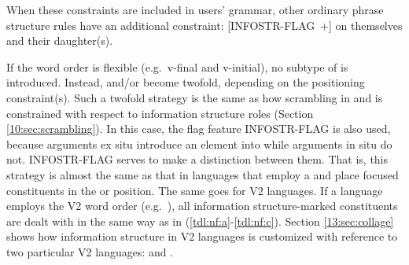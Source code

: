 




\noindent When these constraints are included in users' grammar, other
ordinary phrase structure rules have an additional constraint:
\mbox{[INFOSTR-FLAG +]} on themselves and their daughter(s).



If the word order is flexible (e.g.\ v-final and v-initial), no
subtype of  is introduced. Instead,
 and/or  become twofold,
depending on the positioning constraint(s).  Such a twofold strategy
is the same as how scrambling in  and  is
constrained with respect to information structure roles
(Section \ref{10:sec:scrambling}). In this case, the
flag feature INFOSTR-FLAG is also used, because arguments ex
situ introduce an  element into  while
arguments in situ do not. INFOSTR-FLAG serves to make a
distinction between them. That is, this strategy is almost the same as
that in languages that employ a  and place
focused constituents in the  or 
position. The same goes for V2 languages.  If a language employs the
V2 word order (e.g.\ ), all information structure-marked
constituents are dealt with in the same way as in
(\ref{tdl:nf:a}-\ref{tdl:nf:c}).  Section \ref{13:sec:collage} shows how
information structure in V2 languages is customized with reference to
two particular V2 languages:  and .


